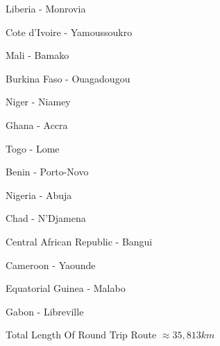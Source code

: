 \documentclass[12pt]{article}
\begin{document}
\begin{multicols}{3}
\begin{enumerate*}
\item Liberia - Monrovia
\item Cote d'Ivoire - Yamoussoukro
\item Mali - Bamako
\item Burkina Faso - Ouagadougou
\item Niger - Niamey
\item Ghana - Accra
\item Togo - Lome
\item Benin - Porto-Novo
\item Nigeria - Abuja
\item Chad - N'Djamena
\item Central African Republic - Bangui
\item Cameroon - Yaounde
\item Equatorial Guinea - Malabo
\item Gabon - Libreville
\end{enumerate*}
\end{multicols}

Total Length Of Round Trip Route $\approx 35,813 km$ \newline
\end{document}

